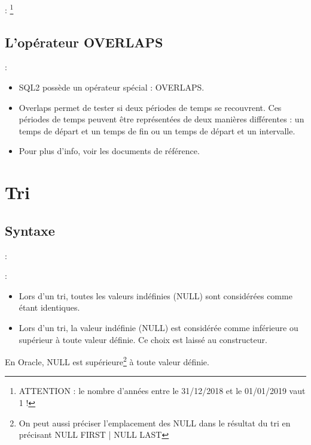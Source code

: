 \documentclass[10pt]{beamer}
\begin{document}
\begin{frame}[allowframebreaks]{\secname : \subsecname}
    \footnote{ATTENTION : le nombre d'années entre le 31/12/2018 et le 01/01/2019 vaut 1 !}
\end{frame}


\subsection{L'opérateur OVERLAPS}
\begin{frame}[allowframebreaks]{\secname : \subsecname}
    \begin{itemize}
        \item SQL2 possède un opérateur spécial : OVERLAPS.
        \item Overlaps permet de tester si deux périodes de temps se recouvrent.
              Ces périodes de temps peuvent être représentées de deux manières différentes : un temps de départ et un temps de fin ou un temps de départ et un intervalle.
        \item Pour plus d'info, voir les documents de référence.
    \end{itemize}
\end{frame}

\section{Tri}
\tocss
\subsection{Syntaxe}
\begin{frame}{\secname : \subsecname}
    
\end{frame}

\begin{frame}{\secname : \subsecname}
    \begin{itemize}
        \item Lors d'un tri, toutes les valeurs indéfinies (NULL) sont considérées comme étant identiques.
        \item Lors d'un tri, la valeur indéfinie (NULL) est considérée comme inférieure ou supérieur à toute valeur définie.  Ce choix est laissé au constructeur.
    \end{itemize}
    En Oracle, NULL est supérieure\footnote{On peut aussi préciser l'emplacement des NULL dans le résultat du tri en précisant NULL FIRST | NULL LAST} à toute valeur définie.
\end{frame}
\end{document}
